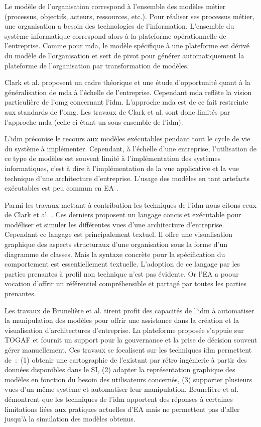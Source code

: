 Le modèle de l'organisation correspond à l'ensemble des modèles métier (processus, objectifs, acteurs, ressources, etc.). Pour réaliser ses processus métier, une organisation a besoin des technologies de l'information. L'ensemble du système informatique correspond alors à la plateforme opérationnelle de l'entreprise. Comme pour \gls{mda}, le modèle spécifique à une plateforme est dérivé du modèle de l'organisation et sert de pivot pour générer automatiquement la plateforme de l'organisation par transformation de modèles.

Clark et al. \cite{clark_towards_2014} proposent un cadre théorique et une étude d'opportunité quant à la généralisation de \gls{mda} à l'échelle de l'entreprise. Cependant \gls{mda} reflète la vision particulière de l'\gls{omg} concernant l'\gls{idm}. L'approche \gls{mda} est de ce fait restreinte aux standards de l'\gls{omg}. Les travaux de Clark et al. sont donc limités par l'approche \gls{mda} (celle-ci étant un sous-ensemble de l'\gls{idm}).

L'\gls{idm} préconise le recours aux modèles exécutables pendant tout le cycle de vie du système à implémenter. Cependant, à l'échelle d'une entreprise, l'utilisation de ce type de modèles est souvent limité à l'implémentation des systèmes informatiques, c'est à dire à l'implémentation de la vue applicative et la vue technique d'une architecture d'entreprise. L'usage des modèles en tant artefacts exécutables est peu commun en EA \cite{kulkarni_modelling_2013}.

Parmi les travaux mettant à contribution les techniques de l'\gls{idm} nous citons ceux de Clark et al. \cite{clark2011leap}. Ces derniers proposent un langage concis et exécutable pour modéliser et simuler les différentes vues d'une architecture d'entreprise. Cependant ce langage est principalement textuel. Il offre une visualisation graphique des aspects structuraux d'une organisation sous la forme d'un diagramme de classes. Mais la syntaxe concrète pour la spécification du comportement est essentiellement textuelle. L'adoption de ce langage par les parties prenantes à profil non technique n'est pas évidente. Or l'EA a poour vocation d'offrir un référentiel compréhensible et partagé par toutes les parties prenantes.

Les travaux de Brunelière et al. \cite{bruneliere2013mde} tirent profit des capacités de l'\gls{idm} à automatiser la manipulation des modèles pour offrir une assistance dans la création et la visualisation d'architectures d'entreprise. La plateforme proposée s'appuie sur TOGAF et fournit un support pour la gouvernance et la prise de décision souvent gérer manuellement. Ces travaux se focalisent sur les techniques \gls{idm} permettent de~:~(1) obtenir une cartographie de l'existant par rétro ingénierie à partir des données disponibles dans le SI, (2) adapter la représentation graphique des modèles en fonction du besoin des utilisateurs concernés, (3) supporter plusieurs vues d'un même système et automatiser leur manipulation. Brunelière et al. \cite{bruneliere2013mde} démontrent que les techniques de l'\gls{idm} apportent des réponses à certaines limitations liées aux pratiques actuelles d'EA mais ne permettent pas d'aller jusqu'à la simulation des modèles obtenus. 

